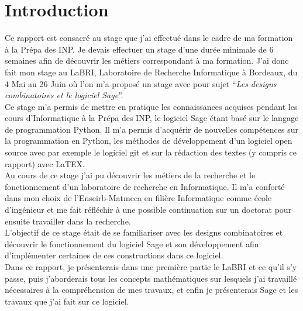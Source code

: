 \documentclass[a4paper]{article}
\begin{document}
\section*{Introduction}
Ce rapport est consacré au stage que j'ai effectué dans le cadre de ma formation à la Prépa des INP. Je devais effectuer un stage d'une durée minimale de 6 semaines afin de découvrir les métiers correspondant à ma formation.
J'ai donc fait mon stage au LaBRI, Laboratoire de Recherche Informatique à Bordeaux, du 4 Mai au 26 Juin où l'on m'a proposé un stage avec pour sujet ``\textit{Les designs combinatoires et le logiciel Sage}''.\vspace{1\baselineskip}\\
Ce stage m'a permis de mettre en pratique les connaissances acquises pendant les cours d'Informatique à la Prépa des INP, le logiciel Sage étant basé sur le langage de programmation Python. Il m'a permis d'acquérir de nouvelles compétences sur la programmation en Python, les méthodes de développement d'un logiciel open source avec par exemple le logiciel git et sur la rédaction des textes (y compris ce rapport) avec LaTEX.\vspace{1\baselineskip}\\
Au cours de ce stage j'ai pu découvrir les métiers de la recherche et le fonctionnement d'un laboratoire de recherche en Informatique. Il m'a conforté dans mon choix de l'Enseirb-Matmeca en filière Informatique comme école d'ingénieur et me fait réfléchir à une possible continuation sur un doctorat pour ensuite travailler dans la recherche.\vspace{1\baselineskip}\\
L'objectif de ce stage était de se familiariser avec les designs combinatoires et découvrir le fonctionnement du logiciel Sage et son développement afin d'implémenter certaines de ces constructions dans ce logiciel. \\
Dans ce rapport, je présenterais dans une première partie le LaBRI et ce qu'il s'y passe, puis j'aborderais tous les concepts mathématiques sur lesquels j'ai travaillé nécessaires à la compréhension de mes travaux, et enfin je présenterais Sage et les travaux que j'ai fait sur ce logiciel. 
\newpage
\end{document}
